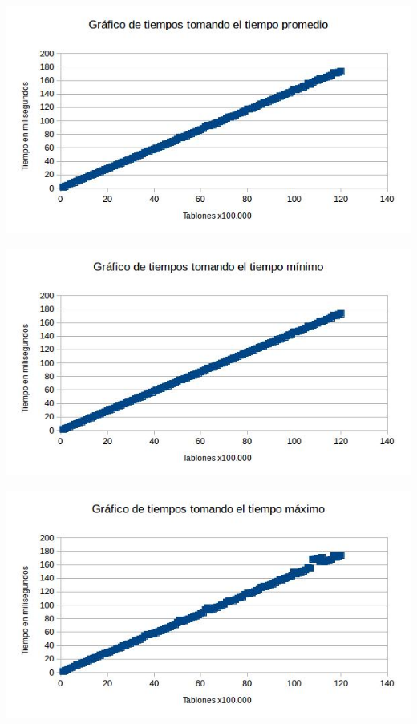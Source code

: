 \documentclass{article}
\begin{document}
\includegraphics[width=\textwidth,height=\textheight,keepaspectratio
]{puentetiempopromedioS.jpg}


 \includegraphics[width=\textwidth,height=\textheight,keepaspectratio
]{puentetiempominimoS.jpg}

\vspace{0.01cm}
\includegraphics[width=\textwidth,height=\textheight,keepaspectratio
]{puentetiempomaximoS.jpg}
\end{document}
